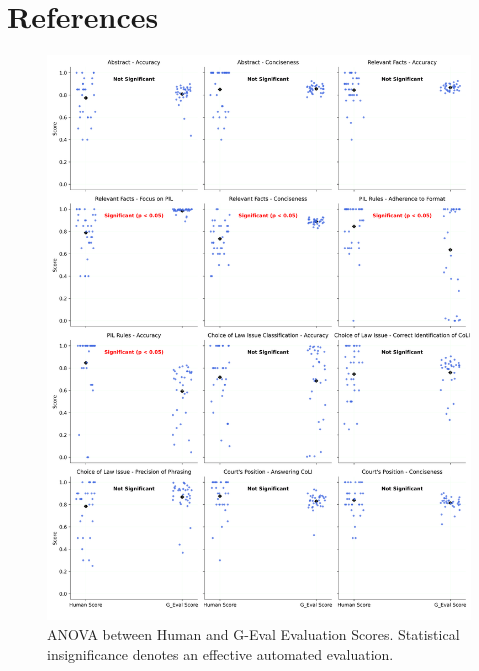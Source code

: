 \documentclass[a4paper,12pt]{article}
\begin{document}
\section*{References}
\printbibliography[heading=empty]

\newpage

\begin{figure}[htp]
\centering
\includegraphics[width=14cm]{metric_anova_comparison.png}
\caption{ANOVA between Human and G-Eval Evaluation Scores. Statistical insignificance denotes an effective automated evaluation.}
\label{fig:image}
\end{figure}
\end{document}

